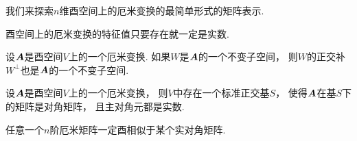 我们来探索\(n\)维酉空间上的厄米变换的最简单形式的矩阵表示.
\begin{proposition}
酉空间上的厄米变换的特征值只要存在就一定是实数.
\end{proposition}

\begin{proposition}
设\(\boldsymbol{A}\)是酉空间\(V\)上的一个厄米变换.
如果\(W\)是\(\boldsymbol{A}\)的一个不变子空间，
则\(W\)的正交补\(W^\perp\)也是\(\boldsymbol{A}\)的一个不变子空间.
\end{proposition}

\begin{theorem}
设\(\boldsymbol{A}\)是酉空间\(V\)上的一个厄米变换，
则\(V\)中存在一个标准正交基\(S\)，
使得\(\boldsymbol{A}\)在基\(S\)下的矩阵是对角矩阵，
且主对角元都是实数.
\end{theorem}

\begin{corollary}
任意一个\(n\)阶厄米矩阵一定酉相似于某个实对角矩阵.
\end{corollary}
